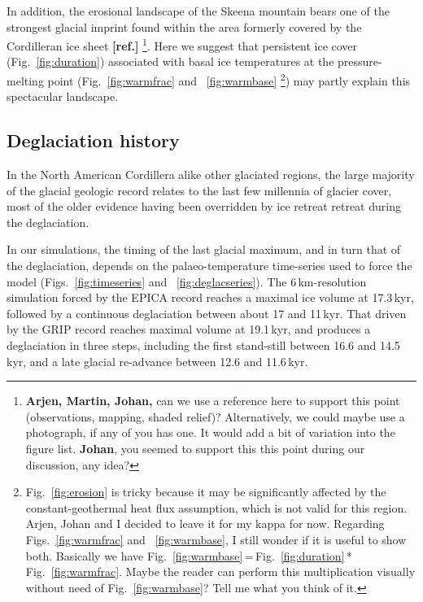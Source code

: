 \documentclass[tc, manuscript]{copernicus}
\newcommand{\aref}[0]{\textbf{[ref.]}}
\begin{document}
In addition, the erosional landscape of the Skeena mountain bears one of the
strongest glacial imprint found within the area formerly covered by the
Cordilleran ice sheet \aref%
\footnote{\textbf{Arjen, Martin, Johan,} can we use a reference here to support
    this point (observations, mapping, shaded relief)? Alternatively, we could
    maybe use a photograph, if any of you has one. It would add a bit of
    variation into the figure list. \textbf{Johan}, you seemed to support this
    this point during our discussion, any idea?}.
Here we suggest that persistent ice cover (Fig.~\ref{fig:duration})
associated with basal ice temperatures at the pressure-melting point
(Fig.~\ref{fig:warmfrac} and ~\ref{fig:warmbase}%
\footnote{Fig.~\ref{fig:erosion} is tricky because it may be significantly
    affected by the constant-geothermal heat flux assumption, which is not
    valid for this region. Arjen, Johan and I decided to leave it for my kappa
    for now. Regarding Figs.~\ref{fig:warmfrac} and ~\ref{fig:warmbase}, I
    still wonder if it is useful to show both. Basically we have
    Fig.~\ref{fig:warmbase}\,=\,Fig.~\ref{fig:duration}\,*\,Fig.~\ref{fig:warmfrac}.
    Maybe the reader can perform this multiplication visually without need of
    Fig.~\ref{fig:warmbase}? Tell me what you think of it.})
may partly explain this spectacular landscape.

\subsection{Deglaciation history}

In the North American Cordillera alike other glaciated regions, the large
majority of the glacial geologic record relates to the last few millennia of
glacier cover, most of the older evidence having been overridden by ice retreat
retreat during the deglaciation.

In our simulations, the timing of the last glacial maximum, and in turn that of
the deglaciation, depends on the palaeo-temperature time-series used to force
the model (Figs.~\ref{fig:timeseries} and ~\ref{fig:deglacseries}). The
6\,km-resolution simulation forced by the EPICA record reaches a maximal
ice volume at 17.3\,kyr, followed by a continuous deglaciation between
about 17 and 11\,kyr. That driven by the GRIP record reaches maximal
volume at 19.1\,kyr, and produces a deglaciation in three steps,
including the first stand-still between 16.6 and 14.5\,kyr, and a late
glacial re-advance between 12.6 and 11.6\,kyr.
\end{document}
